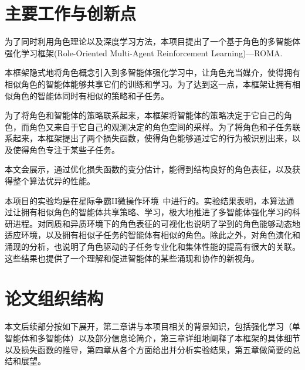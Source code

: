 \section{主要工作与创新点}
为了同时利用角色理论以及深度学习方法，本项目提出了一个基于角色的多智能体强化学习框架(Role-Oriented Multi-Agent Reinforcement Learning)---ROMA.

本框架隐式地将角色概念引入到多智能体强化学习中，让角色充当媒介，使得拥有相似角色的智能体能够共享它们的训练和学习。为了达到这一点，本框架让拥有相似角色的智能体同时有相似的策略和子任务。

为了将角色和智能体的策略联系起来，本框架将智能体的策略决定于它自己的角色，而角色又来自于它自己的观测决定的角色空间的采样。为了将角色和子任务联系起来，本框架提出了两个损失函数，使得角色能够通过它的行为被识别出来，以及使得角色专注于某些子任务。

本文会展示，通过优化损失函数的变分估计，能得到结构良好的角色表征，以及获得整个算法优异的性能。

本项目的实验均是在星际争霸II微操作环境~\cite{vinyals2017starcraft, samvelyan2019starcraft}中进行的。实验结果表明，本算法通过让拥有相似角色的智能体共享策略、学习，极大地推进了多智能体强化学习的科研进程。对同质和异质环境下的角色表征的可视化也说明了学到的角色能够动态地适应环境，以及拥有相似子任务的智能体有相似的角色。除此之外，对角色演化和涌现的分析，也说明了角色驱动的子任务专业化和集体性能的提高有很大的关联。这些结果也提供了一个理解和促进智能体的某些涌现和协作的新视角。

\section{论文组织结构}
本文后续部分按如下展开，第二章讲与本项目相关的背景知识，包括强化学习（单智能体和多智能体）以及部分信息论简介，第三章详细地阐释了本框架的具体细节以及损失函数的推导，第四章从各个方面给出并分析实验结果，第五章做简要的总结和展望。